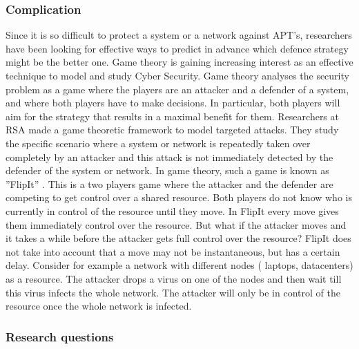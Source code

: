 \subsubsection{Complication}
Since it is so difficult to protect a system or a network against APT's, researchers have been looking for effective ways to predict in advance which defence strategy might be the better one. 
Game theory is gaining increasing interest as an effective technique to model and study Cyber Security. Game theory analyses the security problem as a game where the players are an attacker and a defender of a system, and where both players have to make decisions. In particular, both players will aim for the strategy that results in a maximal benefit for them.  Researchers at RSA made a game theoretic framework to model targeted attacks. They study the specific scenario where a system or network is repeatedly taken over completely by an attacker and this attack is not immediately detected by the defender of the system or network. In game theory, such a game is known as ''FlipIt'' \cite{FlipIt}. This is a two players game where the attacker and the defender are competing to get control over a shared resource. Both players do not know who is currently in control of the resource until they move. In FlipIt every move gives them immediately control over the resource. But what if the attacker moves and it takes a while before the attacker gets full control over the resource? FlipIt does not take into account that a move may not be instantaneous, but has a certain delay. Consider for example a network with different nodes ( laptops, datacenters) as a resource. The attacker drops a virus on one of the nodes and then wait till this virus infects the whole network. The attacker will only be in control of the resource once the whole network is infected. \\

\subsubsection{Research questions}


